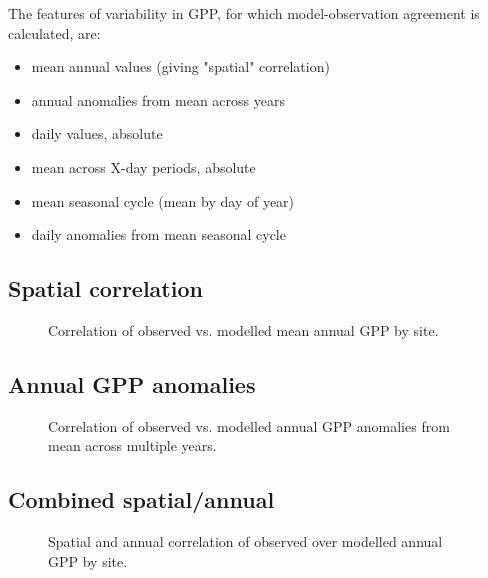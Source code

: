 \documentclass{myreport}
\begin{document}
The features of variability in GPP, for which model-observation agreement is calculated, are:
\begin{itemize}
    \item mean annual values (giving "spatial" correlation)
    \item annual anomalies from mean across years
    \item daily values, absolute
    \item mean across X-day periods, absolute
    \item mean seasonal cycle (mean by day of year)
    \item daily anomalies from mean seasonal cycle
\end{itemize}

\clearpage

\subsection{Spatial correlation}

\begin{figure}[!ht]
    \centering
    \caption{Correlation of observed vs. modelled mean annual GPP by site.}
    \label{fig:modobs_spatial}
\end{figure}

\clearpage


\subsection{Annual GPP anomalies}

\begin{figure}[!ht]
    \centering
    \caption{Correlation of observed vs. modelled annual GPP anomalies from mean across multiple years.}
    \label{fig:modobs_iav}
\end{figure}

\clearpage


\subsection{Combined spatial/annual}

\begin{figure}[!ht]
    \centering
    \caption{Spatial and annual correlation of observed over modelled annual GPP by site.}
    \label{fig:modobs_spatialannual}
\end{figure}
\end{document}
